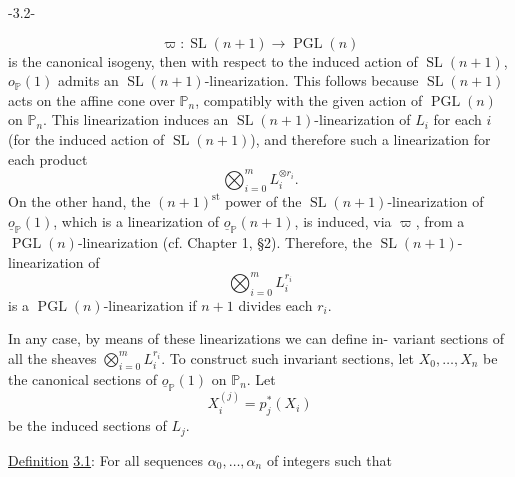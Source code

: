 \begin{center}-3.2-\end{center}
\[
\varpi:\operatorname{SL}(n+1)\longrightarrow\operatorname{PGL}(n)
\]
is the canonical isogeny, then with respect to the induced action of
$\operatorname{SL}(n+1)$, $o_{\mathbb P}(1)$ admits an $\operatorname{SL}(n+1)$-linearization. This follows
because $\operatorname{SL}(n+1)$ acts on the affine cone over $\mathbb P_n$, compatibly with
the given action of $\operatorname{PGL}(n)$ on $\mathbb P_n$. This linearization induces an
$\operatorname{SL}(n+1)$-linearization of $L_i$ for each $i$ (for the induced action of
$\operatorname{SL}(n+1)$), and therefore such a linearization for each product
\[
\bigotimes_{i=0}^{m}L_i^{\otimes r_i}.
\]
On the other hand, the $(n+1)^{\mathrm{st}}$ power of the $\operatorname{SL}(n+1)$-linearization of
$\underline{o}_{\mathbb P}(1)$, which is a linearization of $\underline{o}_{\mathbb P}(n+1)$, is induced, via $\varpi$,
from a $\operatorname{PGL}(n)$-linearization (cf. Chapter 1, §2). Therefore, the
$\operatorname{SL}(n+1)$-linearization of
\[
\bigotimes_{i=0}^{m}L_i^{r_i}
\]
is a $\operatorname{PGL}(n)$-linearization if $n+1$ divides each $r_i$.

In any case, by means of these linearizations we can define in-
variant sections of all the sheaves $\bigotimes_{i=0}^{m}L_i^{r_i}$. To construct such
invariant sections, let $X_0,\ldots,X_n$ be the canonical sections of $\underline{o}_{\mathbb P}(1)$
on $\mathbb P_n$. Let
\[
X_i^{(j)}=p_j^*(X_i)
\]
be the induced sections of $L_j$.

\uline{Definition} \uline{3.1}: For all sequences $\alpha_0,\ldots,\alpha_n$ of integers such that

